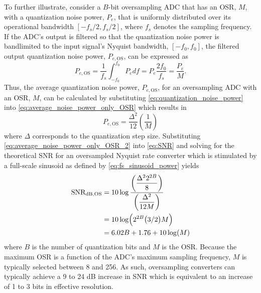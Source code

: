 To further illustrate, consider a $B$-bit oversampling ADC that has an OSR, $M$, with a
quantization noise power, $P_e$, that is uniformly distributed over its operational
bandwidth $\left[-f_s/2,f_s/2\right]$, where $f_s$ denotes the sampling frequency. If the
ADC's output is filtered so that the quantization noise power is bandlimited to the input
signal's Nyquist bandwidth, $\left[-f_0,f_0\right]$, the filtered output quantization
noise power, $P_{e,\text{OS}}$, can be expressed as
\begin{equation}\label{eq:average_noise_power_only_OSR}
 P_{e,\text{OS}}=\frac{1}{f_s}\int_{-f_0}^{f_0}P_e
d f=P_e\frac{2f_0}{f_s}=\frac{P_e}{M}\text{.}
\end{equation}
Thus, the average quantization noise power, $P_{e,\text{OS}}$, for an oversampling ADC
with an OSR, $M$, can be calculated by substituting \eqref{eq:quantization_noise_power}
into \eqref{eq:average_noise_power_only_OSR} which results in
\begin{equation}\label{eq:average_noise_power_only_OSR_2}
 P_{e,\text{OS}}=\frac{\Delta^2}{12}\left(\frac{1}{M}\right)
\end{equation}
where $\Delta$ corresponds to the quantization step size. Substituting
\eqref{eq:average_noise_power_only_OSR_2} into \eqref{eq:SNR} and solving for the
theoretical SNR for an oversampled Nyquist rate converter which is stimulated by a
full-scale sinusoid as defined by \eqref{eq:fs_sinusoid_power} yields
\begin{equation}\label{eq:SNR_OSR}
\begin{split}
\text{SNR}_\text{dB,OS}& =
10\log\frac{\left(\displaystyle\frac{\Delta^22^{2B}}{8}\right)}{\left(\displaystyle\frac
{\Delta^2}{12M}\right)}\\
& =10\log\Bigl(2^{2B}\bigl(3/2\bigr)M\Bigr)\\
& = 6.02B + 1.76+10\log(M)
\end{split}
\end{equation}
where $B$ is the number of quantization bits and $M$ is the OSR. Because the maximum OSR
is a function of the ADC's maximum sampling frequency, $M$ is typically selected between 8
and 256. As such, oversampling converters can typically achieve a 9 to 24 dB increase in
SNR which is equivalent to an increase of 1 to 3 bits in effective resolution.

